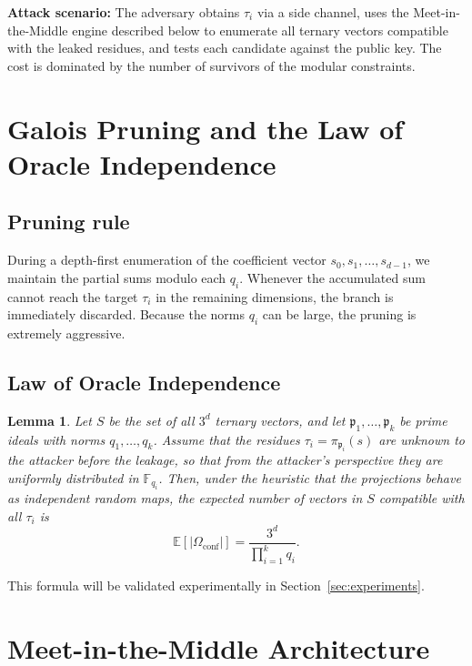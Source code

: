 \documentclass[12pt,a4paper]{article}
\newtheorem{lemma}{Lemma}[section]
\begin{document}
\noindent\textbf{Attack scenario:} The adversary obtains $\tau_i$ via a side channel, uses the Meet-in-the-Middle engine described below to enumerate all ternary vectors compatible with the leaked residues, and tests each candidate against the public key. The cost is dominated by the number of survivors of the modular constraints.

\section{Galois Pruning and the Law of Oracle Independence}
\label{sec:law}

\subsection{Pruning rule}
During a depth-first enumeration of the coefficient vector $s_0, s_1, \dots, s_{d-1}$, we maintain the partial sums modulo each $q_i$. Whenever the accumulated sum cannot reach the target $\tau_i$ in the remaining dimensions, the branch is immediately discarded. Because the norms $q_i$ can be large, the pruning is extremely aggressive.

\subsection{Law of Oracle Independence}
\begin{lemma}
\label{lem:oracle}
Let $S$ be the set of all $3^d$ ternary vectors, and let $\mathfrak{p}_1,\dots,\mathfrak{p}_k$ be prime ideals with norms $q_1,\dots,q_k$. Assume that the residues $\tau_i = \pi_{\mathfrak{p}_i}(s)$ are unknown to the attacker before the leakage, so that from the attacker's perspective they are uniformly distributed in $\mathbb{F}_{q_i}$. Then, under the heuristic that the projections behave as independent random maps, the expected number of vectors in $S$ compatible with all $\tau_i$ is
\begin{equation}
\label{eq:law}
\mathbb{E}[|\Omega_{\mathrm{conf}}|] = \frac{3^d}{\prod_{i=1}^k q_i}.
\end{equation}
\end{lemma}

This formula will be validated experimentally in Section~\ref{sec:experiments}.

\section{Meet-in-the-Middle Architecture}
\label{sec:mitm}
\end{document}
